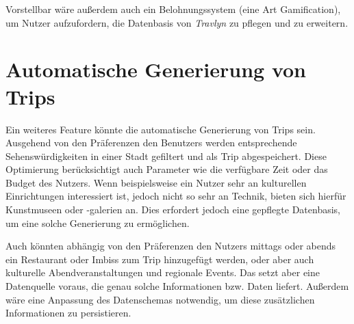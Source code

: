		Vorstellbar wäre außerdem auch ein Belohnungssystem (eine Art Gamification), um Nutzer aufzufordern, die Datenbasis von \textit{Travlyn} zu pflegen und zu erweitern. 
				
	\section{Automatische Generierung von Trips}
	
		Ein weiteres Feature könnte die automatische Generierung von Trips sein. Ausgehend von den Präferenzen den Benutzers werden entsprechende Sehenswürdigkeiten in einer Stadt gefiltert und als Trip abgespeichert. Diese Optimierung berücksichtigt auch Parameter wie die verfügbare Zeit oder das Budget des Nutzers. Wenn beispielsweise ein Nutzer sehr an kulturellen Einrichtungen interessiert ist, jedoch nicht so sehr an Technik, bieten sich hierfür \zB Kunstmuseen oder -galerien an. Dies erfordert jedoch eine gepflegte Datenbasis, um eine solche Generierung zu ermöglichen. 
		
		Auch könnten abhängig von den Präferenzen den Nutzers mittags oder abends ein Restaurant oder Imbiss zum Trip hinzugefügt werden, oder aber auch kulturelle Abendveranstaltungen und regionale Events. Das setzt aber eine Datenquelle voraus, die genau solche Informationen bzw. Daten liefert. Außerdem wäre eine Anpassung des Datenschemas notwendig, um diese zusätzlichen Informationen zu persistieren. 
		
	